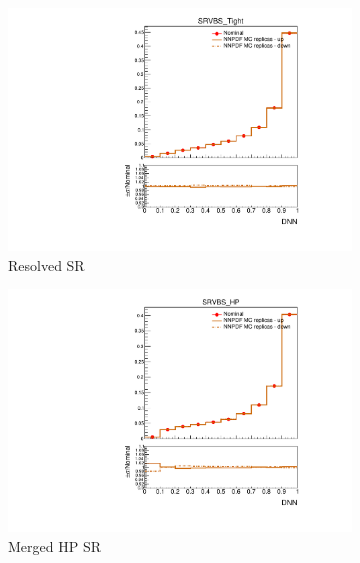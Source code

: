 \begin{figure}[ht]
    \centering
    \begin{subfigure}[b]{0.3\textwidth}
        \includegraphics[width=\textwidth]{figures/1lep/PDFUnc/NNPDF_DNN/EW6lvqq_0ptag2pjet_0ptv_SRVBS_Tight_DNN_SysTheoryPDF_NNPDF_VBS__1up_Norm.pdf}
        \caption{Resolved SR}
    \end{subfigure}
    \begin{subfigure}[b]{0.3\textwidth}
        \includegraphics[width=\textwidth]{figures/1lep/PDFUnc/NNPDF_DNN/EW6lvqq_0ptag1pfat0pjet_0ptv_SRVBS_HP_DNN_SysTheoryPDF_NNPDF_VBS__1up_Norm.pdf}
        \caption{Merged HP SR}
    \end{subfigure}
    \begin{subfigure}[b]{0.3\textwidth}

\end{subfigure}
\end{figure}
